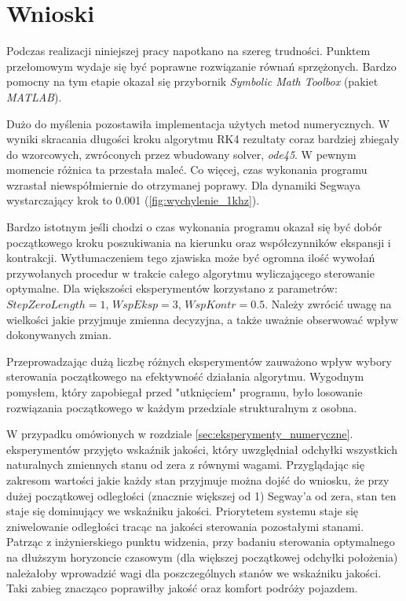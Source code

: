 \section{Wnioski}
\label{sec:wnioski}

Podczas realizacji niniejszej pracy napotkano na szereg trudności. Punktem przełomowym wydaje się być poprawne rozwiązanie równań sprzężonych. Bardzo pomocny na tym etapie okazał się przybornik \textit{Symbolic Math Toolbox} (pakiet \textit{MATLAB}).

Dużo do myślenia pozostawiła implementacja użytych metod numerycznych. W wyniki skracania długości kroku algorytmu RK4 rezultaty coraz bardziej zbiegały do wzorcowych, zwróconych przez wbudowany solver, \textit{ode45}. W pewnym momencie różnica ta przestała maleć. Co więcej, czas wykonania programu wzrastał niewspółmiernie do otrzymanej poprawy. Dla dynamiki Segwaya wystarczający krok to 0.001 (\ref{fig:wychylenie_1khz}).

Bardzo istotnym jeśli chodzi o czas wykonania programu okazał się być dobór początkowego kroku poszukiwania na kierunku oraz współczynników  ekspansji i kontrakcji. Wytłumaczeniem tego zjawiska może być ogromna ilość wywołań przywołanych procedur w trakcie całego algorytmu wyliczającego sterowanie optymalne. Dla większości eksperymentów korzystano z parametrów: $StepZeroLength = 1$, $WspEksp = 3$, $WspKontr = 0.5$. Należy zwrócić uwagę na wielkości jakie przyjmuje zmienna decyzyjna, a także uważnie obserwować wpływ dokonywanych zmian.

Przeprowadzając dużą liczbę różnych eksperymentów zauważono wpływ wybory sterowania początkowego na efektywność działania algorytmu. Wygodnym pomysłem, który zapobiegał przed "utknięciem" programu, było losowanie rozwiązania początkowego w każdym przedziale strukturalnym z osobna.

W przypadku omówionych w rozdziale \ref{sec:eksperymenty_numeryczne}. eksperymentów przyjęto wskaźnik jakości, który uwzględniał odchyłki wszystkich naturalnych zmiennych stanu od zera z równymi wagami. Przyglądając się zakresom wartości jakie każdy stan przyjmuje można dojść do wniosku, że przy dużej początkowej odległości (znacznie większej od 1) Segway'a od zera, stan ten staje się dominujący we wskaźniku jakości. Priorytetem systemu staje się zniwelowanie odległości tracąc na jakości sterowania pozostałymi stanami. Patrząc z inżynierskiego punktu widzenia, przy badaniu sterowania optymalnego na dłuższym horyzoncie czasowym (dla większej początkowej odchyłki położenia) należałoby wprowadzić wagi dla poszczególnych stanów we wskaźniku jakości. Taki zabieg znacząco poprawiłby jakość oraz komfort podróży pojazdem.
